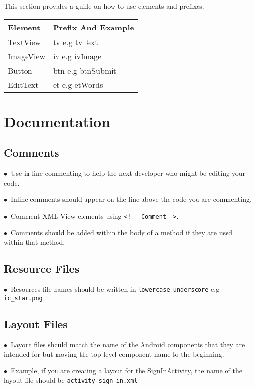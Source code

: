 \documentclass[english]{article}
\begin{document}
This section provides a guide on how to use elements and prefixes.
				\\
				\begin{tabular}{ |p{3cm}|p{9cm}|  }
				\hline
				\textbf{Element} & \textbf{Prefix And Example}  \\
				\hline
				
				TextView &	tv	e.g tvText\\
				\hline
				ImageView &	iv	e.g ivImage\\
				\hline
				Button &	btn	e.g btnSubmit\\
				\hline
				EditText &	et	e.g etWords \\
				\hline
				\end{tabular}

\section{Documentation}

\subsection{Comments}
$\bullet$\ Use in-line commenting to help the next developer who might be editing your code.\par
$\bullet$\ Inline comments should appear on the line above the code you are commenting.\par
$\bullet$\ Comment XML View elements using  \texttt{<! -- Comment -->}.\par
$\bullet$\ Comments should be added within the body of a method if they are used within that method.\par



\subsection{Resource Files}
$\bullet$\ Resources file names should be written in  \texttt{lowercase\_underscore}  e.g  \texttt{ic\_star.png} \par


\subsection{Layout Files}

$\bullet$\ Layout files should match the name of the Android components that they are intended for but moving the top level component name to the beginning. \par
$\bullet$\ Example, if you are creating a layout for the SignInActivity, the name of the layout file should be \texttt{activity\_sign\_in.xml} \par
\end{document}
